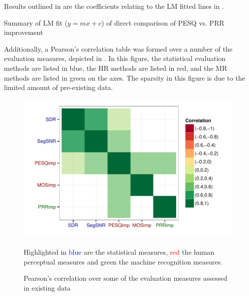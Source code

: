 Results outlined in  are the
coefficients relating to the \ac{LM} fitted lines in .

\begin{table}[h]
\protect\caption{\label{tab:LF-Fit-Direct-Compar-PESQ-PRR}Summary of \acs{LM} fit
($y=mx+c$) of direct comparison of \acs{PESQ} vs. \acs{PRR} improvement}


\centering{}
\end{table}


Additionally, a Pearson's correlation table was formed over a number
of the evaluation measures, depicted in . In this
figure, the statistical evaluation methods are listed in blue, the
\ac{HR} methods are listed in red, and the \ac{MR} methods are listed
in green on the axes. The sparsity in this figure is due to the limited
amount of pre-existing data.

\begin{figure}[h]
\noindent \begin{centering}
\includegraphics[width=1\textwidth]{fig/R/cor/litResCorr}
\par\end{centering}

\protect\caption{\label{fig:litResCorr}Pearson's correlation over some of the evaluation
measures assessed in existing data}


Highlighted in \textcolor{blue}{blue} are the statistical measures,
\textcolor{red}{red} the human perceptual measures and \textcolor{dkgreen}{green}
the machine recognition measures.
\end{figure}


